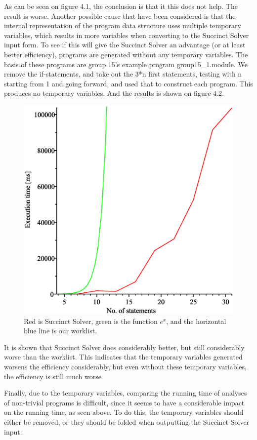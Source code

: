 As can be seen on figure 4.1, the conclusion is that it this does not help. The result is worse. Another possible cause that have
been considered is that the internal representation of the program data structure uses
multiple temporary variables, which results in more variables when converting to the Succinct Solver
input form. To see if this will give the Succinct Solver an advantage (or
at least better efficiency), programs are generated without any temporary
variables. The basis of these programs are group 15's example program group15\_1.module.
We remove the if-statements, and take out the 3*n first statements, testing with n starting
from 1 and going forward, and used that to construct each program. This produces no temporary
variables. And the results is shown on figure 4.2.

\begin{figure}
\includegraphics[width=1\textwidth]{alfp_mod15_graph.eps}
\caption{Red is Succinct Solver, green is the function $e^x$, and the horizontal blue line is our worklist.}
\end{figure}

It is shown that Succinct Solver does considerably better, but still considerably worse
than the worklist. This indicates that the temporary variables generated worsens the
efficiency considerably, but even without these temporary variables, the efficiency
is still much worse.

Finally, due to the temporary variables, comparing the running time of analyses of non-trivial programs
is difficult, since it seems to have a considerable impact on the running time, as seen above.
To do this, the temporary variables should either be removed, or they should be folded when
outputting the Succinct Solver input.

